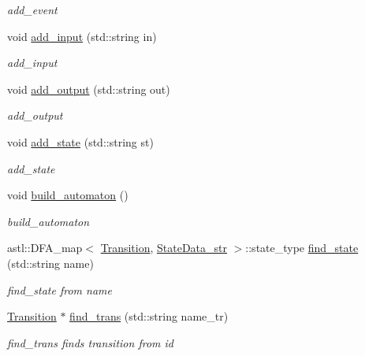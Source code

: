 \begin{DoxyCompactItemize}
\begin{DoxyCompactList}\small\item\em add\+\_\+event \end{DoxyCompactList}\item 
void \hyperlink{class_component_model_a4f7421bbe94259bc579d05b197a4885d}{add\+\_\+input} (std\+::string in)
\begin{DoxyCompactList}\small\item\em add\+\_\+input \end{DoxyCompactList}\item 
void \hyperlink{class_component_model_a759f3d8b44dc9d50242dc2914f8d2302}{add\+\_\+output} (std\+::string out)
\begin{DoxyCompactList}\small\item\em add\+\_\+output \end{DoxyCompactList}\item 
void \hyperlink{class_component_model_a018585d39632c1137fccdd5a636fc429}{add\+\_\+state} (std\+::string st)
\begin{DoxyCompactList}\small\item\em add\+\_\+state \end{DoxyCompactList}\item 
void \hyperlink{class_component_model_a60a971d9497c283d1b53b19955197d2e}{build\+\_\+automaton} ()\hypertarget{class_component_model_a60a971d9497c283d1b53b19955197d2e}{}\label{class_component_model_a60a971d9497c283d1b53b19955197d2e}

\begin{DoxyCompactList}\small\item\em build\+\_\+automaton \end{DoxyCompactList}\item 
astl\+::\+D\+F\+A\+\_\+map$<$ \hyperlink{class_transition}{Transition}, \hyperlink{class_state_data__str}{State\+Data\+\_\+str} $>$\+::state\+\_\+type \hyperlink{class_component_model_a1dce877ed60027f1346b521d848d0889}{find\+\_\+state} (std\+::string name)
\begin{DoxyCompactList}\small\item\em find\+\_\+state from name \end{DoxyCompactList}\item 
\hyperlink{class_transition}{Transition} $\ast$ \hyperlink{class_component_model_a3788c218834cffc04c0cd4239364c7df}{find\+\_\+trans} (std\+::string name\+\_\+tr)
\begin{DoxyCompactList}\small\item\em find\+\_\+trans finds transition from id \end{DoxyCompactList}\end{DoxyCompactItemize}
